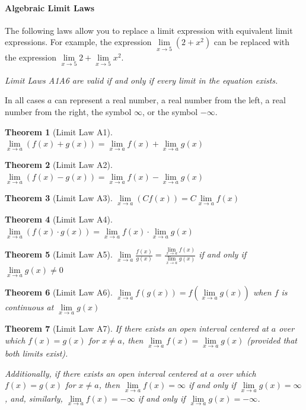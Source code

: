 \documentclass[10pt,oneside,]{book}
\theoremstyle{plain}
\newtheorem{theorem}{Theorem}[section]
\theoremstyle{definition}
\numberwithin{equation}{section}
\newcommand{\fe}[2]{#1\mathopen{}\left(#2\right)\mathclose{}}
\begin{document}
\paragraph[Algebraic Limit Laws]{Algebraic Limit Laws}\label{paragraphs-76}
The following laws allow you to replace a limit expression with equivalent limit expressions. For example, the expression \(\lim\limits_{x\to5}\left(2+x^2\right)\) can be replaced with the expression \(\lim\limits_{x\to5}2+\lim\limits_{x\to5}x^2\).%
\par
\emph{Limit Laws A1\textendash{}A6 are valid if and only if every limit in the equation exists.}%
\par
In all cases \(a\) can represent a real number, a real number from the left, a real number from the right, the symbol \(\infty\), or the symbol \(-\infty\).%
\begin{theorem}[Limit Law A1]\label{lla1}
\(\lim\limits_{x\to a}\left(\fe{f}{x}+\fe{g}{x}\right)=\lim\limits_{x\to a}\fe{f}{x}+\lim\limits_{x\to a}\fe{g}{x}\)%
\end{theorem}
\begin{theorem}[Limit Law A2]\label{lla2}
\(\lim\limits_{x\to a}\left(\fe{f}{x}-\fe{g}{x}\right)=\lim\limits_{x\to a}\fe{f}{x}-\lim\limits_{x\to a}\fe{g}{x}\)%
\end{theorem}
\begin{theorem}[Limit Law A3]\label{lla3}
\(\lim\limits_{x\to a}\left(C\fe{f}{x}\right)=C\lim\limits_{x\to a}\fe{f}{x}\)%
\end{theorem}
\begin{theorem}[Limit Law A4]\label{lla4}
\(\lim\limits_{x\to a}\left(\fe{f}{x}\cdot\fe{g}{x}\right)=\lim\limits_{x\to a}\fe{f}{x}\cdot\lim\limits_{x\to a}\fe{g}{x}\)%
\end{theorem}
\begin{theorem}[Limit Law A5]\label{lla5}
\(\lim\limits_{x\to a}\frac{\fe{f}{x}}{\fe{g}{x}}=\frac{\lim\limits_{x\to a}\fe{f}{x}}{\lim\limits_{x\to a}\fe{g}{x}}\) if and only if \(\lim\limits_{x\to a}\fe{g}{x}\neq0\)%
\end{theorem}
\begin{theorem}[Limit Law A6]\label{lla6}
\(\lim\limits_{x\to a}\fe{f}{\fe{g}{x}}=\fe{f}{\lim\limits_{x\to a}\fe{g}{x}}\) when \(f\) is continuous at \(\lim\limits_{x\to a}\fe{g}{x}\)%
\end{theorem}
\begin{theorem}[Limit Law A7]\label{lla7}
If there exists an open interval centered at \(a\) over which \(\fe{f}{x}=\fe{g}{x}\) for \(x\neq a\), then \(\lim\limits_{x\to a}\fe{f}{x}=\lim\limits_{x\to a}\fe{g}{x}\) (provided that both limits exist).%
\par
Additionally, if there exists an open interval centered at \(a\) over which \(\fe{f}{x}=\fe{g}{x}\) for \(x\neq a\), then \(\lim\limits_{x\to a}\fe{f}{x}=\infty\) if and only if \(\lim\limits_{x\to a}\fe{g}{x}=\infty\), and, similarly, \(\lim\limits_{x\to a}\fe{f}{x}=-\infty\) if and only if \(\lim\limits_{x\to a}\fe{g}{x}=-\infty\).%
\end{theorem}
\typeout{************************************************}
\typeout{************************************************}
\end{document}
